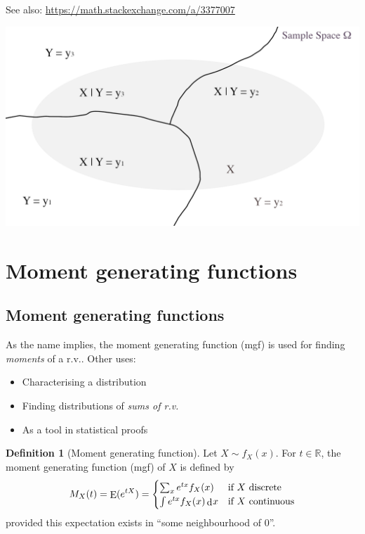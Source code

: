 \documentclass[
]{book}
\providecommand{\tightlist}{%
  \setlength{\itemsep}{0pt}\setlength{\parskip}{0pt}}
\DeclareMathOperator{\E}{E}
\newcommand{\bbR}{\mathbb{R}}
\DeclareMathOperator{\dd}{d}
\newcommand{\dint}{\dd\hspace{0.5pt}\!}
\theoremstyle{definition}
\newtheorem{definition}{Definition}[chapter]
\theoremstyle{definition}
\theoremstyle{definition}
\theoremstyle{definition}
\theoremstyle{remark}
\begin{document}
See also: \url{https://math.stackexchange.com/a/3377007}

\begin{center}\includegraphics[width=0.8\linewidth]{figure/lawoftotalvariance} \end{center}

\hypertarget{moment-generating-functions}{%
\section{Moment generating functions}\label{moment-generating-functions}}

\hypertarget{moment-generating-functions-1}{%
\subsection{Moment generating functions}\label{moment-generating-functions-1}}

As the name implies, the moment generating function (mgf) is used for finding \emph{moments} of a r.v..
Other uses:

\begin{itemize}
\tightlist
\item
  Characterising a distribution
\item
  Finding distributions of \emph{sums of r.v.}
\item
  As a tool in statistical proofs
\end{itemize}

\begin{definition}[Moment generating function]
Let $X\sim f_X(x)$. For $t\in\bbR$, the moment generating function (mgf) of $X$ is defined by
\[
M_X(t) = \E(e^{tX}) = \begin{cases}
\sum_x e^{tx} f_X(x) &\text{if $X$ discrete} \\
\int e^{tx} f_X(x) \dint x &\text{if $X$ continuous} \\
\end{cases}
\]
provided this expectation exists in ``some neighbourhood of 0''.
\end{definition}
\end{document}
